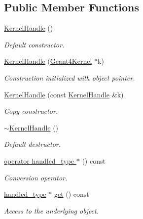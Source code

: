 \subsection*{Public Member Functions}
\begin{DoxyCompactItemize}
\item 
\hyperlink{class_d_d4hep_1_1_simulation_1_1_kernel_handle_a03e3f33ee46b60ab2daaad008ef59418}{Kernel\+Handle} ()
\begin{DoxyCompactList}\small\item\em Default constructor. \end{DoxyCompactList}\item 
\hyperlink{class_d_d4hep_1_1_simulation_1_1_kernel_handle_afdab1fdc93f7b1a96c792dd03f97a6ef}{Kernel\+Handle} (\hyperlink{class_d_d4hep_1_1_simulation_1_1_geant4_kernel}{Geant4\+Kernel} $\ast$k)
\begin{DoxyCompactList}\small\item\em Construction initialized with object pointer. \end{DoxyCompactList}\item 
\hyperlink{class_d_d4hep_1_1_simulation_1_1_kernel_handle_a39502e0ffd2e8d1ac079992e9359aee4}{Kernel\+Handle} (const \hyperlink{class_d_d4hep_1_1_simulation_1_1_kernel_handle}{Kernel\+Handle} \&k)
\begin{DoxyCompactList}\small\item\em Copy constructor. \end{DoxyCompactList}\item 
\hyperlink{class_d_d4hep_1_1_simulation_1_1_kernel_handle_a66d1b2fafb35c14ac47720c9b184d01d}{$\sim$\+Kernel\+Handle} ()
\begin{DoxyCompactList}\small\item\em Default destructor. \end{DoxyCompactList}\item 
\hyperlink{class_d_d4hep_1_1_simulation_1_1_kernel_handle_a91a97b663c123e414c821c25cd076183}{operator handled\+\_\+type $\ast$} () const
\begin{DoxyCompactList}\small\item\em Conversion operator. \end{DoxyCompactList}\item 
\hyperlink{class_d_d4hep_1_1_simulation_1_1_kernel_handle_ab3846addea4978dab36bdb0cfb53dc34}{handled\+\_\+type} $\ast$ \hyperlink{class_d_d4hep_1_1_simulation_1_1_kernel_handle_a6cbcb5c6bb2369ce2b9c43ce1d0287c5}{get} () const
\begin{DoxyCompactList}\small\item\em Access to the underlying object. \end{DoxyCompactList}\item 

\end{DoxyCompactItemize}

